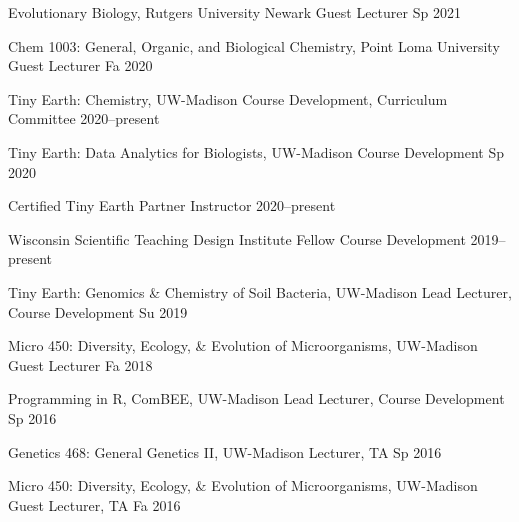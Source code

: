 \newpage


\begin{cvhonors}

\cvhonor
{Evolutionary Biology, Rutgers University Newark}
{Guest Lecturer}
{Sp 2021}

\cvhonor
{Chem 1003: General, Organic, and Biological Chemistry, Point Loma University}
{Guest Lecturer}
{Fa 2020}

\cvhonor
{Tiny Earth: Chemistry, UW-Madison}
{Course Development, Curriculum Committee}
{2020--present}

\cvhonor
{Tiny Earth: Data Analytics for Biologists, UW-Madison}
{Course Development}
{Sp 2020}

\cvhonor
{Certified Tiny Earth Partner Instructor}
{}
{2020--present}

\cvhonor
{Wisconsin Scientific Teaching Design Institute Fellow}
{Course Development}
{2019--present}

\cvhonor
{Tiny Earth: Genomics \& Chemistry of Soil Bacteria, UW-Madison}
{Lead Lecturer, Course Development}
{Su 2019}

\cvhonor
{Micro 450: Diversity, Ecology, \& Evolution of Microorganisms, UW-Madison}
{Guest Lecturer}
{Fa 2018}

\cvhonor
{Programming in R, ComBEE, UW-Madison}
{Lead Lecturer, Course Development}
{Sp 2016}

\cvhonor
{Genetics 468: General Genetics II, UW-Madison}
{Lecturer, TA}
{Sp 2016}

\cvhonor
{Micro 450: Diversity, Ecology, \& Evolution of Microorganisms, UW-Madison}
{Guest Lecturer, TA}
{Fa 2016}

\end{cvhonors}
